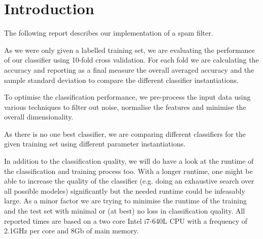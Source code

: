 \section{Introduction}
The following report describes our implementation of a spam filter.

As we were only given a labelled training set, we are evaluating the performance of our classifier using 10-fold cross validation.
For each fold we are calculating the accuracy and reporting as a final measure the overall averaged accuracy and the sample standard deviation to compare the different classifier instantiations.

To optimise the classification performance, we pre-process the input data using various techniques to filter out noise, normalise the features and minimise the overall dimensionality.

As there is no one best classifier, we are comparing different classifiers for the given training set using different parameter instantiations.

In addition to the classification quality, we will do have a look at the runtime of the classification and training process too.
With a longer runtime, one might be able to increase the quality of the classifier (e.g. doing an exhaustive search over all possible modeles) significantly but the needed runtime could be infeasably large.
As a minor factor we are trying to minimise the runtime of the training and the test set with minimal or (at best) no loss in classification quality.
All reported times are based on a two core Intel i7-640L CPU with a frequency of 2.1GHz per core and 8Gb of main memory.

